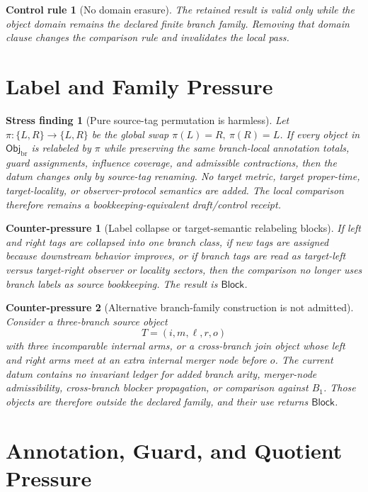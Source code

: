 \documentclass[11pt]{article}
\newcommand{\ObjBr}{\mathsf{Obj}_{\mathrm{br}}}
\newcommand{\Block}{\mathsf{Block}}
\newtheorem{stressfinding}{Stress finding}
\newtheorem{counterpressure}{Counter-pressure}
\newtheorem{controlrule}{Control rule}
\begin{document}
\begin{controlrule}[No domain erasure]
The retained result is valid only while the object domain remains the
declared finite branch family. Removing that domain clause changes the
comparison rule and invalidates the local pass.
\end{controlrule}

\section{Label and Family Pressure}

\begin{stressfinding}[Pure source-tag permutation is harmless]
Let \(\pi:\{L,R\}\to\{L,R\}\) be the global swap
\(\pi(L)=R,\ \pi(R)=L\). If every object in \(\ObjBr\) is relabeled by
\(\pi\) while preserving the same branch-local annotation totals, guard
assignments, influence coverage, and admissible contractions, then the
datum changes only by source-tag renaming. No target metric, target
proper-time, target-locality, or observer-protocol semantics are added.
The local comparison therefore remains a bookkeeping-equivalent
draft/control receipt.
\end{stressfinding}

\begin{counterpressure}[Label collapse or target-semantic relabeling blocks]
If left and right tags are collapsed into one branch class, if new tags
are assigned because downstream behavior improves, or if branch tags are
read as target-left versus target-right observer or locality sectors,
then the comparison no longer uses branch labels as source bookkeeping.
The result is \(\Block\).
\end{counterpressure}

\begin{counterpressure}[Alternative branch-family construction is not admitted]
Consider a three-branch source object
\[
    T=(i,m,\ell,r,o)
\]
with three incomparable internal arms, or a cross-branch join object
whose left and right arms meet at an extra internal merger node before
\(o\). The current datum contains no invariant ledger for added branch
arity, merger-node admissibility, cross-branch blocker propagation, or
comparison against \(B_{1}\). Those objects are therefore outside the
declared family, and their use returns \(\Block\).
\end{counterpressure}

\section{Annotation, Guard, and Quotient Pressure}
\end{document}

